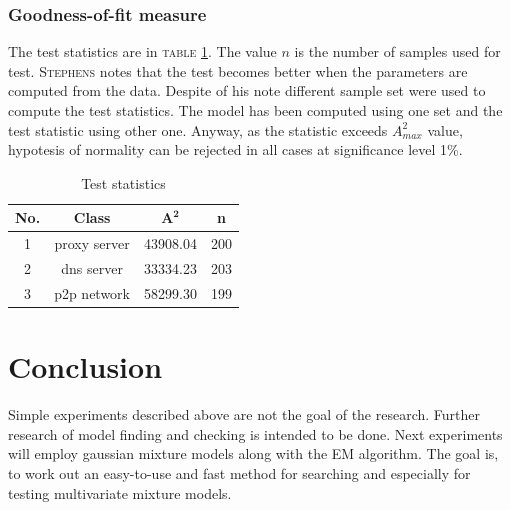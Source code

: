 \documentclass[a4paper,journal]{IEEEtran}
\begin{document}
\subsubsection{Goodness-of-fit measure}

The test statistics are in  \textsc{table \ref{tbl:anders}}.
The value $n$ is the number of samples used for test.
\textsc{Stephens} \cite{Ste74} notes that the test becomes better when the parameters 
are computed from the data. Despite of his note different sample set were used to compute the test statistics.
The model has been computed using one set
and the test statistic using other one. 
Anyway, as the statistic exceeds $A^2_{max}$ value, hypotesis of normality can be rejected in all cases
at significance level 1\%.

\begin{table}[!h]
\caption{Test statistics}
\begin{center}
\begin{tabular}{|c|c|c|c|}\hline
\textbf{No.} & \textbf{Class} & $\mathbf{A^2}$ &  \textbf{n} \\ \hline
1 & proxy server & 43908.04 & 200 \\ \hline
2 & dns server & 33334.23 & 203 \\ \hline
3 & p2p network & 58299.30 & 199 \\ \hline
\end{tabular}
\end{center}
\label{tbl:anders}
\end{table}

\section{Conclusion}
Simple experiments described above are not the goal of the research.
Further research of model finding and checking is intended to be done. 
Next experiments will employ gaussian mixture models along with the EM algorithm. 
The goal is, to work out  an easy-to-use and fast method for searching and especially for testing 
 multivariate mixture models.
\end{document}
